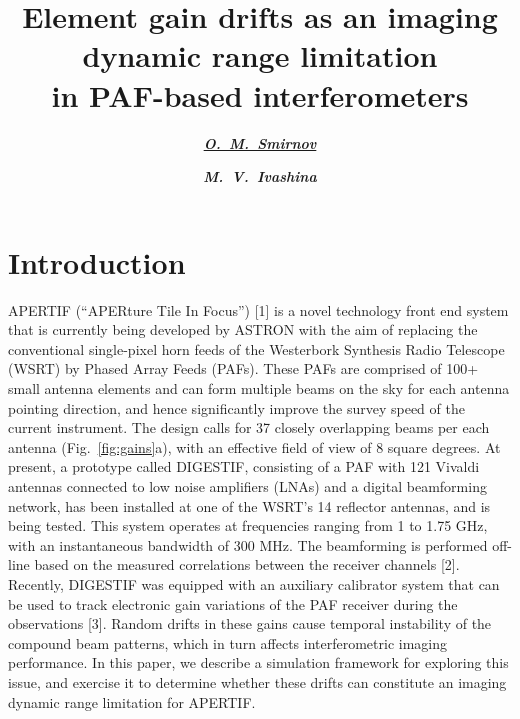 \documentclass{aps2010} \special{papersize=8.5in,11in}
\title{Element gain drifts as an imaging dynamic range limitation\\in PAF-based
interferometers}
\author[org1]{\textbf{\underline{\emph{O.\ M.\ Smirnov}}}}
\author[org2]{\textbf{\emph{M.\ V.\ Ivashina}}}
\begin{document}
\maketitleblock


\section{Introduction}

\noindent APERTIF (“APERture Tile In Focus”) [1] is a novel technology front end system that is currently being developed by ASTRON with the aim of replacing the conventional single-pixel horn feeds of the Westerbork Synthesis Radio Telescope (WSRT) by Phased Array Feeds (PAFs). These PAFs are comprised of 100+ small antenna elements and can form multiple beams on the sky for each antenna pointing direction, and hence significantly improve the survey speed of the current instrument. The design calls for 37 closely overlapping beams per each antenna (Fig.~\ref{fig:gains}a), with an effective field of view of 8 square degrees. At present, a prototype called DIGESTIF, consisting of a PAF with 121 Vivaldi antennas connected to low noise amplifiers (LNAs) and a digital beamforming network, has been installed at one of the WSRT's 14 reflector antennas, and is being tested. This system operates at frequencies ranging from 1 to 1.75 GHz, with an instantaneous bandwidth of 300 MHz. The beamforming is performed off-line based on the measured correlations between the receiver channels [2]. Recently, DIGESTIF was equipped with an auxiliary calibrator system that can be used to track electronic gain variations of the PAF receiver during the observations [3]. Random drifts in these gains cause temporal instability of the compound beam patterns, which in turn affects interferometric imaging performance. In this paper, we describe a simulation framework for exploring this issue, and exercise it to determine whether these drifts can constitute an imaging dynamic range limitation for APERTIF.
\end{document}
